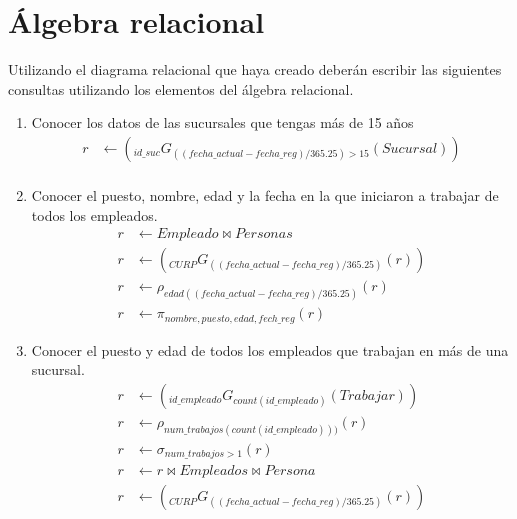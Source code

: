 \documentclass{article}
\begin{document}
    \section{Álgebra relacional}
    Utilizando el diagrama relacional que haya creado deberán escribir las
    siguientes consultas utilizando los elementos del álgebra relacional.
    \begin{enumerate}
        \item {
            Conocer los datos de las sucursales que tengas más de 15 años
            \begin{align*}
                r &\leftarrow (_{id\_suc}G_{((fecha\_actual-fecha\_reg)/365.25) > 15}(Sucursal)) \\
            \end{align*}
        }
        \item {
            Conocer el puesto, nombre, edad y la fecha en la que iniciaron a
            trabajar de todos los empleados.
            \begin{align*}
                r &\leftarrow Empleado \bowtie Personas \\
                r &\leftarrow (_{CURP}G_{((fecha\_actual-fecha\_reg)/365.25)}(r))\\
                r &\leftarrow \rho_{edad((fecha\_actual-fecha\_reg)/365.25)}(r) \\
                r &\leftarrow \pi_{nombre, puesto, edad, fech\_reg}(r)
            \end{align*}
        }
        \item {
            Conocer el puesto y edad de todos los empleados que trabajan en más 
            de una sucursal.
            \begin{align*}
                r &\leftarrow (_{id\_empleado}G_{count(id\_empleado)}(Trabajar)) \\
                r &\leftarrow \rho_{num\_trabajos(count(id\_empleado)))}(r)\\
                r &\leftarrow \sigma_{num\_trabajos>1}(r)\\
                r &\leftarrow r \bowtie Empleados \bowtie Persona \\
                r &\leftarrow (_{CURP}G_{((fecha\_actual-fecha\_reg)/365.25)}(r))\\

\end{align*}}
\end{enumerate}
\end{document}
